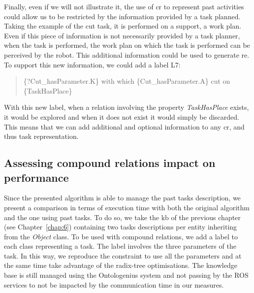 Finally, even if we will not illustrate it, the use of \acrshort{cr} to represent past activities could allow us to be restricted by the information provided by a task planned. Taking the example of the cut task, it is performed on a support, a work plan. Even if this piece of information is not necessarily provided by a task planner, when the task is performed, the work plan on which the task is performed can be perceived by the robot. This additional information could be used to generate \acrshort{re}. To support this new information, we could add a label L7:

\begin{quote} 
\centering 
\{?Cut\_hasParameter.K\} with which \{Cut\_hasParameter.A\} cut on \{TaskHasPlace\}
\end{quote}

With this new label, when a relation involving the property \textit{TaskHasPlace} exists, it would be explored and when it does not exist it would simply be discarded. This means that we can add additional and optional information to any \acrshort{cr}, and thus task representation.

\subsection{Assessing compound relations impact on performance}

Since the presented algorithm is able to manage the past tasks description, we present a comparison in terms of execution time with both the original algorithm and the one using past tasks. To do so, we take the \acrlong{kb} of the previous chapter (see Chapter~\ref{chap:6}) containing two tasks descriptions per entity inheriting from the \textit{Object} class. To be used with compound relations, we add a label to each class representing a task. The label involves the three parameters of the task. In this way, we reproduce the constraint to use all the parameters and at the same time take advantage of the radix-tree optimisations. The knowledge base is still managed using the Ontologenius system and not passing by the ROS services to not be impacted by the communication time in our measures.

